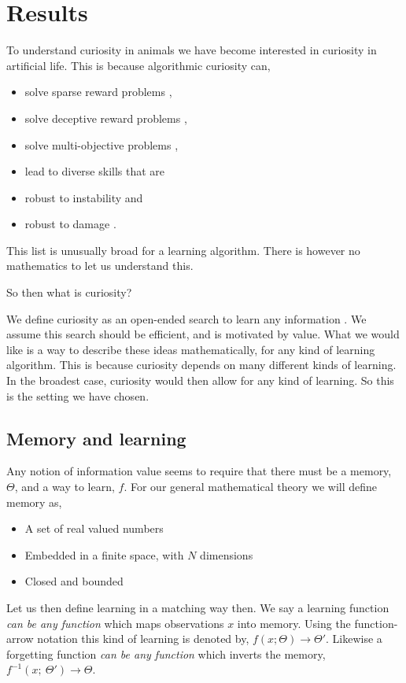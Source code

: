 \section{Results} 
To understand curiosity in animals we have become interested in curiosity in artificial life. This is because algorithmic curiosity can,

\begin{itemize}
\item solve sparse reward problems \cite{needed},
\item solve deceptive reward problems \cite{needed},
\item solve multi-objective problems \cite{needed},
\item lead to diverse skills that are
\item robust to instability and \cite{needed} 
\item robust to damage \cite{needed}.
\end{itemize}

This list is unusually broad for a learning algorithm. There is however no mathematics to let us understand this. 

So then what is curiosity? 

We define curiosity as an open-ended search to learn any information \cite{Kidd2015}. We assume this search should be efficient, and is motivated by value. What we would like is a way to describe these ideas mathematically, for any kind of learning algorithm. This is because curiosity depends on many different kinds of learning. In the broadest case, curiosity would then allow for any kind of learning. So this is the setting we have chosen. 

\subsection{Memory and learning} 
Any notion of information value seems to require that there must be a memory, $\Theta$, and a way to learn, $f$. For our general mathematical theory we will define memory as,

\begin{itemize}
\item A set of real valued numbers
\item Embedded in a finite space, with $N$ dimensions 
\item Closed and bounded
\end{itemize}

Let us then define learning in a matching way then. We say a learning function \textit{can be any function} which maps observations $x$ into memory. Using the function-arrow notation this kind of learning is denoted by, $f(x;\Theta) \rightarrow \Theta'$. Likewise a forgetting function \textit{can be any function} which inverts the memory, $f^{-1}(x;\ \Theta') \rightarrow \Theta$. 


